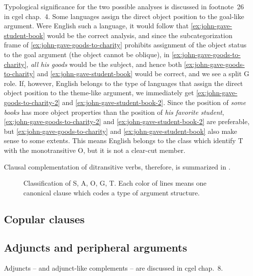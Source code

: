 \documentclass{article}
\newcommand*{\citechap}[1]{chap.~{#1}}
\newcommand*{\citefootnote}[1]{footnote~{#1}}
\newcommand*{\corpus}[1]{\emph{#1}}
\begin{document}
Typological significance for the two possible analyses is discussed in
\citefootnote{26} in \ac{cgel} \citechap{4}.
Some languages assign the direct object position to the goal-like argument.
Were English such a language, 
it would follow that \eqref{ex:john-gave-student-book} would be the correct analysis,
and since the subcategorization frame of \eqref{ex:john-gave-goods-to-charity} 
prohibits assignment of the object status to the goal argument
(the object cannot be oblique),
in \eqref{ex:john-gave-goods-to-charity},
\corpus{all his goods} would be the subject,
and hence both \eqref{ex:john-gave-goods-to-charity} and \eqref{ex:john-gave-student-book} 
would be correct,
and we see a split G role.
If, however, English belongs to the type of languages 
that assign the direct object position to the theme-like argument,
we immediately get \eqref{ex:john-gave-goods-to-charity-2} and \eqref{ex:john-gave-student-book-2}.
Since the position of \corpus{some books} has more object properties 
than the position of \corpus{his favorite student},
\eqref{ex:john-gave-goods-to-charity-2} and \eqref{ex:john-gave-student-book-2} are preferable,
but \eqref{ex:john-gave-goods-to-charity} and \eqref{ex:john-gave-student-book} also make sense 
to some extents.
This means English belongs to the class which identify T with the monotransitive O, 
but it is not a clear-cut member.

Clausal complementation of ditransitive verbs, therefore, is summarized in .

\begin{figure}
    \centering
    
    \caption{Classification of S, A, O, G, T. Each color of lines means one canonical clause which codes a type of argument structure.}
    \label{fig:ditransitive-gt}
\end{figure}

\subsection{Copular clauses}

\subsection{Adjuncts and peripheral arguments}\label{sec:adjuncts-classification}

Adjuncts -- and adjunct-like complements -- are discussed in \ac{cgel} \citechap{8}.
\end{document}
